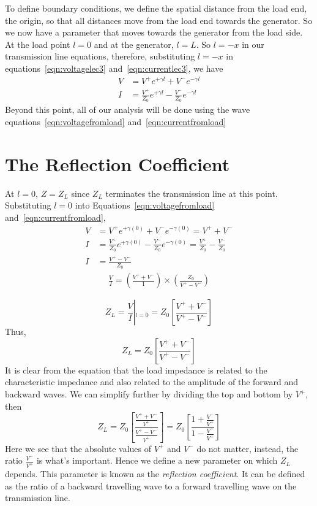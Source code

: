 To define boundary conditions, we define the spatial distance from the load end, the origin, so that all distances move from the load end towards the generator. So we now have a parameter that moves towards the generator from the load side. At the load point $l = 0$ and at the generator, $l = L$. So $l = -x$ in our transmission line equations, therefore, substituting $l = -x$ in equations~\ref{eqn:voltagelec3} and~\ref{eqn:currentlec3}, we have
\begin{align}
V &= V^+e^{+\gamma l}+V^-e^{-\gamma l}
\label{eqn:voltagefromload}\\
I &= \frac{V^+}{Z_0}e^{+\gamma l}-\frac{V^-}{Z_0}e^{-\gamma l}
\label{eqn:currentfromload}
\end{align}
Beyond this point, all of our analysis will be done using the wave equations~\eqref{eqn:voltagefromload} and~\eqref{eqn:currentfromload}

\section{The Reflection Coefficient}
At $l = 0$, $Z = Z_L$ since $Z_L$ terminates the transmission line at this point. Substituting $l = 0$ into Equations~\eqref{eqn:voltagefromload} and~\eqref{eqn:currentfromload},
\begin{align*}
V &= V^+e^{+\gamma (0)}+V^-e^{-\gamma (0)} = V^+ + V^-\\
I &= \frac{V^+}{Z_0}e^{+\gamma (0)}-\frac{V^-}{Z_0}e^{-\gamma (0)} = \frac{V^+}{Z_0} - \frac{V^-}{Z_0} \\
I &= \frac{V^+ - V^-}{Z_0}
\end{align*}
\begin{align*}
\frac{V}{I} = \left( \frac{V^+ + V^-}{1}\right)  \times \left( \frac{Z_0}{V^+ - V^-}\right) 
\end{align*}

\begin{equation*}
Z_{L} = \frac{V}{I}\left|_{l = 0} = Z_0 \left[ \frac{V^+ + V^-}{V^+ - V^-} \right]\right.    
\end{equation*}
Thus,
\begin{equation}
Z_L = Z_0 \left[\frac{V^+ + V^-}{V^+ - V^-} \right]
\end{equation}
It is clear from the equation that the load impedance is related to the characteristic impedance and also related to the amplitude of the forward and backward waves. We can simplify further by dividing the top and bottom by $V^+$, then
\begin{dmath}
Z_L = Z_0\left[ \frac{\frac{V^+ + V^-}{V^+}}{\frac{V^+ - V^-}{V^+}}\right]
= Z_0\left[ \frac{1+ \frac{V^-}{V^+}}{1 - \frac{V^-}{V^+}}\right] 
\label{eqn:impedatload}
\end{dmath}
Here we see that the absolute values of $V^+$ and $V^-$ do not matter, instead, the ratio $\frac{V^-}{V^+}$ is what's important. Hence we define a new parameter on which $Z_L$ depends. This parameter is known as the \emph{reflection coefficient}. It can be defined as the ratio of a backward travelling wave to a forward travelling wave on the transmission line.

